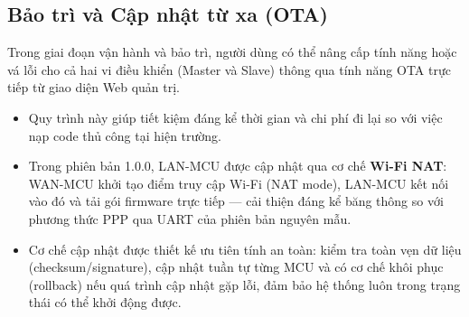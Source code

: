     \subsection{Bảo trì và Cập nhật từ xa (OTA)}
    Trong giai đoạn vận hành và bảo trì, người dùng có thể nâng cấp tính năng hoặc vá lỗi cho cả hai vi điều khiển (Master và Slave) thông qua tính năng OTA trực tiếp từ giao diện Web quản trị.

    \begin{itemize}
        \item Quy trình này giúp tiết kiệm đáng kể thời gian và chi phí đi lại so với việc nạp code thủ công tại hiện trường.
        \item Trong phiên bản 1.0.0, LAN-MCU được cập nhật qua cơ chế \textbf{Wi-Fi NAT}: WAN-MCU khởi tạo điểm truy cập Wi-Fi (NAT mode), LAN-MCU kết nối vào đó và tải gói firmware trực tiếp — cải thiện đáng kể băng thông so với phương thức PPP qua UART của phiên bản nguyên mẫu.
        \item Cơ chế cập nhật được thiết kế ưu tiên tính an toàn: kiểm tra toàn vẹn dữ liệu (checksum/signature), cập nhật tuần tự từng MCU và có cơ chế khôi phục (rollback) nếu quá trình cập nhật gặp lỗi, đảm bảo hệ thống luôn trong trạng thái có thể khởi động được.
    \end{itemize}